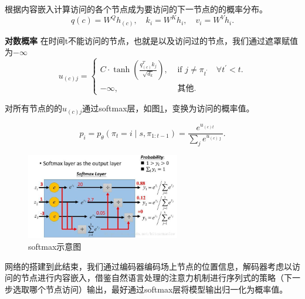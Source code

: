 \documentclass{whutmod}
\begin{document}
根据内容嵌入计算访问的各个节点成为要访问的下一节点的的概率分布。
\begin{equation}
	q (c)=W^{Q} h _{(c)}, \quad k _{i}=W^{K} h _{i}, \quad v _{i}=W^{V} h _{i}.
\end{equation}

\textbf{对数概率}\quad
在时间t不能访问的节点，也就是以及访问过的节点，我们通过遮罩赋值为$-\infty$
\begin{equation}
	u_{(c) j}=\left\{\begin{array}{ll}
		C \cdot \tanh \left(\frac{ q _{(c)}^{T} k _{j}}{\sqrt{d_{k}}}\right), & \text { if } j \neq \pi_{t^{\prime}} \quad \forall t^{\prime}<t. \\
		-\infty, & \text { 其他. }
		\end{array}\right.
\end{equation}

对所有节点的的$u_{(c) j}$通过softmax层，如图\ref{fig:softmax}，变换为访问的概率值。

\begin{equation}
	p_{i}=p_{ \theta }\left(\pi_{t}=i \mid s, \pi_{1: t-1}\right)=\frac{e^{u_{(c) t}}}{\sum_{j} e^{u_{(c) \jmath}}}.
\end{equation}
\begin{figure}[!h]
	\centering
	\includegraphics[width=0.6\textwidth]{softmax.jpg}
	\caption{softmax示意图}
	\label{fig:softmax}
\end{figure}
网络的搭建到此结束，我们通过编码器编码场上节点的位置信息，解码器考虑以访问的节点进行内容嵌入，借鉴自然语言处理的注意力机制进行序列式的策略（下一步选取哪个节点访问）输出，最好通过softmax层将模型输出归一化为概率值。
\end{document}
